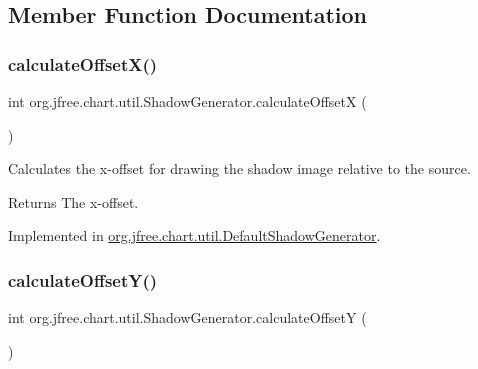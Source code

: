 \subsection{Member Function Documentation}
\mbox{\label{interfaceorg_1_1jfree_1_1chart_1_1util_1_1_shadow_generator_a8a4a3d5012c0aa1d45ddb68e390f7968}} 
\subsubsection{\texorpdfstring{calculate\+Offset\+X()}{calculateOffsetX()}}
{\footnotesize\ttfamily int org.\+jfree.\+chart.\+util.\+Shadow\+Generator.\+calculate\+OffsetX (\begin{DoxyParamCaption}{ }\end{DoxyParamCaption})}

Calculates the x-\/offset for drawing the shadow image relative to the source.

\begin{DoxyReturn}{Returns}
The x-\/offset. 
\end{DoxyReturn}


Implemented in \mbox{\hyperlink{classorg_1_1jfree_1_1chart_1_1util_1_1_default_shadow_generator_a30826c0062e4caa01d58438d4fd05733}{org.\+jfree.\+chart.\+util.\+Default\+Shadow\+Generator}}.

\mbox{\label{interfaceorg_1_1jfree_1_1chart_1_1util_1_1_shadow_generator_a86796160b6e9262408d7848d8ddaff0f}} 
\subsubsection{\texorpdfstring{calculate\+Offset\+Y()}{calculateOffsetY()}}
{\footnotesize\ttfamily int org.\+jfree.\+chart.\+util.\+Shadow\+Generator.\+calculate\+OffsetY (\begin{DoxyParamCaption}{ }\end{DoxyParamCaption})}


